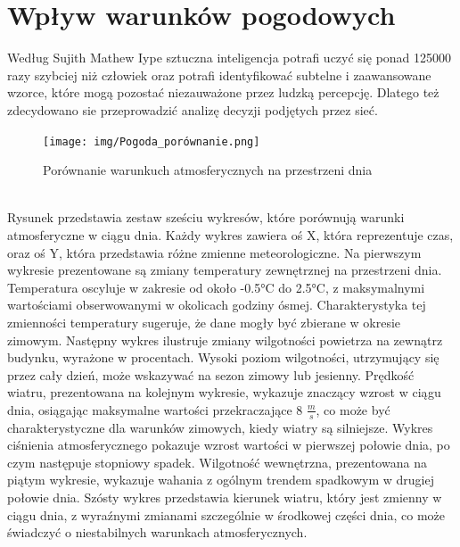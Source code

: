 \documentclass[a4paper,twoside,12pt]{book}
\begin{document}
\chapter{Wpływ warunków pogodowych}
\label{ch:pogoda}

Według Sujith Mathew Iype\cite{bib:AI_FAST} sztuczna inteligencja potrafi uczyć się ponad 125000 razy szybciej niż człowiek oraz potrafi identyfikować subtelne i zaawansowane wzorce, które mogą pozostać niezauważone przez ludzką percepcję. Dlatego też zdecydowano sie przeprowadzić analizę decyzji podjętych przez sieć.\\
\begin{figure}[!h]
  \centering
  \texttt{[image: img/Pogoda\_porównanie.png]}
  \caption{Porównanie warunkuch atmosferycznych na przestrzeni dnia}
  \label{fig:etykieta-rysunku}
\end{figure}\\
Rysunek przedstawia zestaw sześciu wykresów, które porównują warunki atmosferyczne w ciągu dnia. Każdy wykres zawiera oś X, która reprezentuje czas, oraz oś Y, która przedstawia różne zmienne meteorologiczne. Na pierwszym wykresie prezentowane są zmiany temperatury zewnętrznej na przestrzeni dnia. Temperatura oscyluje w zakresie od około -0.5°C do 2.5°C, z maksymalnymi wartościami obserwowanymi w okolicach godziny ósmej. Charakterystyka tej zmienności temperatury sugeruje, że dane mogły być zbierane w okresie zimowym. Następny wykres ilustruje zmiany wilgotności powietrza na zewnątrz budynku, wyrażone w procentach. Wysoki poziom wilgotności, utrzymujący się przez cały dzień, może wskazywać na sezon zimowy lub jesienny. Prędkość wiatru, prezentowana na kolejnym wykresie, wykazuje znaczący wzrost w ciągu dnia, osiągając maksymalne wartości przekraczające 8  $\frac{m}{s}$, co może być charakterystyczne dla warunków zimowych, kiedy wiatry są silniejsze. Wykres ciśnienia atmosferycznego pokazuje wzrost wartości w pierwszej połowie dnia, po czym następuje stopniowy spadek. Wilgotność wewnętrzna, prezentowana na piątym wykresie, wykazuje wahania z ogólnym trendem spadkowym w drugiej połowie dnia. Szósty wykres przedstawia kierunek wiatru, który jest zmienny w ciągu dnia, z wyraźnymi zmianami szczególnie w środkowej części dnia, co może świadczyć o niestabilnych warunkach atmosferycznych.\\
\end{document}
